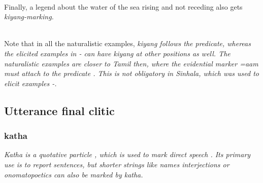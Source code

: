  \\
Finally, a legend about the water of the sea rising and not receding also gets \em kiyang-\em marking.

\\

Note that in all the naturalistic examples, \em kiyang \em follows the predicate, whereas the elicited examples in - can have \em kiyang \em at other positions as well. The naturalistic examples are closer to Tamil then, where the evidential marker \em =aam \em  must attach to the predicate \citep[165]{SmithEtAl2007}. This is not obligatory in Sinhala, which was used to elicit examples -.
 

\subsection{Utterance final clitic}\label{sec:morph:Utterancefinalclitic}
\subsubsection{katha}\label{sec:morph:katha}
\em Katha \em is a quotative particle \citep{Bakker2000convergence},  which is used to mark direct speech \citep{SmithEtAl2004}. Its primary use is to report sentences, but shorter strings like names  interjections or onomatopoetics  can also be marked by \em katha\em.


